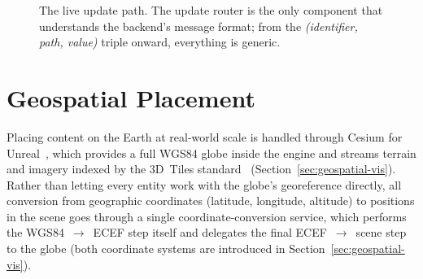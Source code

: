 \begin{figure}[t]
  \centering
  \caption[The live update path]{The live update path. The update router is the only component that understands the backend's message format; from the \emph{(identifier, path, value)} triple onward, everything is generic.}
  \label{fig:live-update}
\end{figure}

\section{Geospatial Placement}
\label{sec:geospatial-placement}

Placing content on the Earth at real-world scale is handled through Cesium for Unreal~\cite{cesiumforunreal}, which provides a full WGS84 globe inside the engine and streams terrain and imagery indexed by the 3D~Tiles standard~\cite{ogc3dtiles} (Section~\ref{sec:geospatial-vis}). Rather than letting every entity work with the globe's georeference directly, all conversion from geographic coordinates (latitude, longitude, altitude) to positions in the scene goes through a single coordinate-conversion service, which performs the WGS84~$\rightarrow$~ECEF step itself and delegates the final ECEF~$\rightarrow$~scene step to the globe (both coordinate systems are introduced in Section~\ref{sec:geospatial-vis}).

